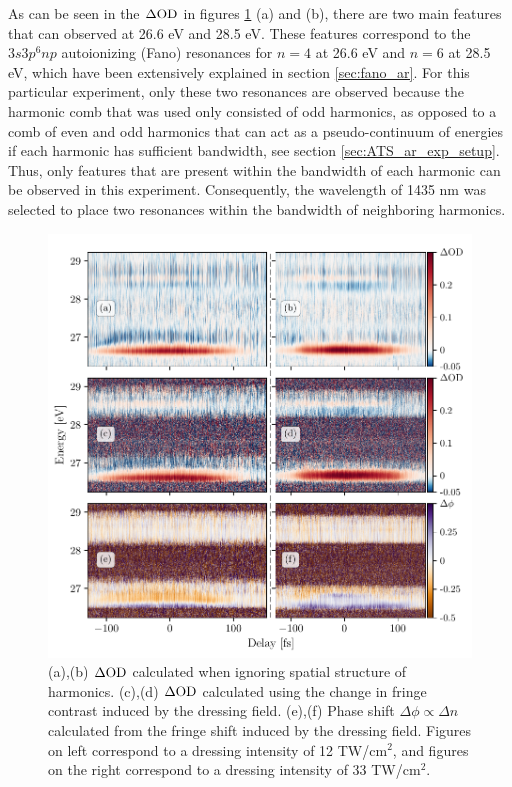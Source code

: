 As can be seen in the $\dod$ in figures \ref{fig:delay_high_low} (a) and (b), there are two main features that can observed at 26.6 eV and 28.5 eV.  These features correspond to the $3s3p^6np$ autoionizing (Fano) resonances for $n=4$ at 26.6 eV and $n=6$ at 28.5 eV, which have been extensively explained in section \ref{sec:fano_ar}.  For this particular experiment, only these two resonances are observed because the harmonic comb that was used only consisted of odd harmonics, as opposed to a comb of even and odd harmonics that can act as a pseudo-continuum of energies if each harmonic has sufficient bandwidth, see section \ref{sec:ATS_ar_exp_setup}.  Thus, only features that are present within the bandwidth of each harmonic can be observed in this experiment.  Consequently, the wavelength of 1435 nm was selected to place two resonances within the bandwidth of neighboring harmonics.

\begin{figure}
	\centering
	\includegraphics[width=1.0\textwidth]{figures/CATS/delay_high_low.pdf}
	\caption[Delay-dependent $\dod$ and $\Delta \phi$ measured at high and moderate dressing intensities]{(a),(b) $\dod$ calculated when ignoring spatial structure of harmonics.  (c),(d)  $\dod$ calculated using the change in fringe contrast induced by the dressing field.  (e),(f) Phase shift $\Delta\phi\propto\Delta n $ calculated from the fringe shift induced by the dressing field.  Figures on left correspond to a dressing intensity of 12 TW/cm$^2$, and figures on the right correspond to a dressing intensity of 33 TW/cm$^2$.}
	\label{fig:delay_high_low}
\end{figure}

